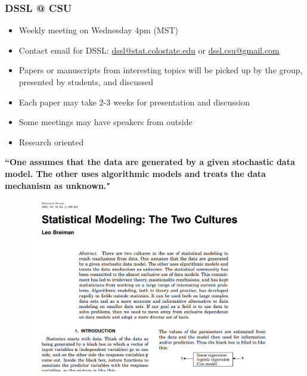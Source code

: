 \documentclass[10pt]{beamer}
\begin{document}
\begin{frame}
\frametitle{DSSL @ CSU}
\begin{itemize}
\item Weekly meeting on Wednesday 4pm (MST)
\item Contact email for DSSL: \url{dssl@stat.colostate.edu} or \url{dssl.csu@gmail.com}
\item Papers or manuscripts from interesting topics will be picked up by the group, presented by students, and discussed  
\item Each paper may take 2-3 weeks for presentation and discussion
\item Some meetings may have speakers from outside
\item Research oriented 
\end{itemize}
\end{frame}
  




\begin{frame}
\begin{spacing}{1.25}
\begin{center}
{\color{blue} \large  \bf ``One assumes that the data are generated
by a given stochastic data model. The other uses algorithmic models and
treats the data mechanism as unknown."}
 \end{center}
\begin{figure}[h]
\centering
\includegraphics[scale=0.25]{f00.png}
\end{figure}
\end{spacing}
\end{frame}
\end{document}
